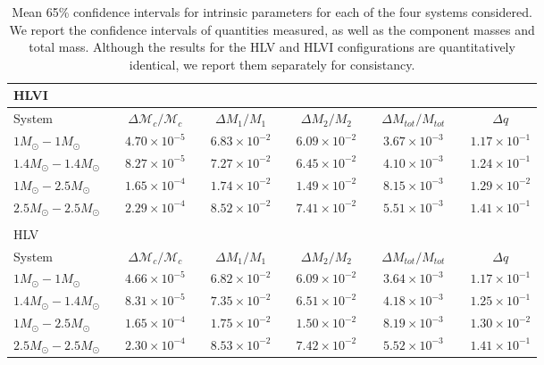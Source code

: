 \documentclass[11pt,a4paper]{emulateapj}
\newcommand{\chmass}{\mathcal{M}_c}
\begin{document}
\begin{table}[t!]
\centering
\caption{Mean 65\% confidence intervals for intrinsic parameters for each of the four systems considered.  We report the confidence intervals of quantities measured, as well as the component masses and total mass.  Although the results for the 
HLV and HLVI configurations are quantitatively identical, we report them separately for consistancy.}
\begin{tabular}{lcccccccccc}

\\HLVI\\
\hline\hline
System & \vline &  $\Delta \chmass / \chmass$ & \vline & $\Delta M_1 / M_1$ & \vline & $\Delta M_2 / M_2$ & \vline & $\Delta M_{tot}/M_{tot}$ & \vline & $\Delta q$\\
\hline\hline
$1M_{\odot}-1M_{\odot}$ & \vline & $4.70\times 10^{-5}$ & \vline & $6.83\times 10^{-2}$ & \vline & $6.09\times 10^{-2}$ & \vline & $3.67\times 10^{-3}$ & \vline & $1.17\times 10^{-1}$\\
\hline
$1.4M_{\odot}-1.4M_{\odot}$ & \vline & $8.27\times 10^{-5}$ & \vline & $7.27\times 10^{-2}$ & \vline & $6.45\times 10^{-2}$ & \vline & $4.10\times 10^{-3}$ & \vline & $1.24\times 10^{-1}$ \\
\hline
$1M_{\odot}-2.5M_{\odot}$ & \vline & $1.65\times 10^{-4}$ & \vline & $1.74\times 10^{-2}$ & \vline & $1.49\times 10^{-2}$ & \vline & $8.15\times 10^{-3}$ & \vline & $1.29\times 10^{-2}$\\\hline
$2.5M_{\odot}-2.5M_{\odot}$ & \vline & $2.29\times 10^{-4}$ & \vline & $8.52\times 10^{-2}$ & \vline & $7.41\times 10^{-2}$ & \vline & $5.51\times 10^{-3}$ & \vline & $1.41\times 10^{-1}$\\
\hline\hline

\\
HLV\\

\hline\hline
System & \vline &  $\Delta \chmass / \chmass$ & \vline & $\Delta M_1 / M_1$ & \vline & $\Delta M_2 / M_2$ & \vline & $\Delta M_{tot}/M_{tot}$ & \vline & $\Delta q$\\
\hline\hline
$1M_{\odot}-1M_{\odot}$ & \vline & $4.66\times 10^{-5}$ & \vline & $6.82\times 10^{-2}$ & \vline & $6.09\times 10^{-2}$ & \vline & $3.64\times 10^{-3}$ & \vline & $1.17\times 10^{-1}$ \\
\hline
$1.4M_{\odot}-1.4M_{\odot}$ & \vline & $8.31\times 10^{-5}$ & \vline & $7.35\times 10^{-2}$ & \vline & $6.51\times 10^{-2}$ & \vline & $4.18\times 10^{-3}$ & \vline & $1.25\times 10^{-1}$\\
\hline
$1M_{\odot}-2.5M_{\odot}$ & \vline & $1.65\times 10^{-4}$ & \vline & $1.75\times 10^{-2}$ & \vline & $1.50\times 10^{-2}$ & \vline & $8.19\times 10^{-3}$ & \vline & $1.30\times 10^{-2}$ \\
\hline
$2.5M_{\odot}-2.5M_{\odot}$ & \vline & $2.30\times 10^{-4}$ & \vline & $8.53\times 10^{-2}$ & \vline & $7.42\times 10^{-2}$ & \vline & $5.52\times 10^{-3}$ & \vline & $1.41\times 10^{-1}$ \\
\hline\hline


\end{tabular}
\label{ciTableIntrinsic}
\end{table}
\end{document}
